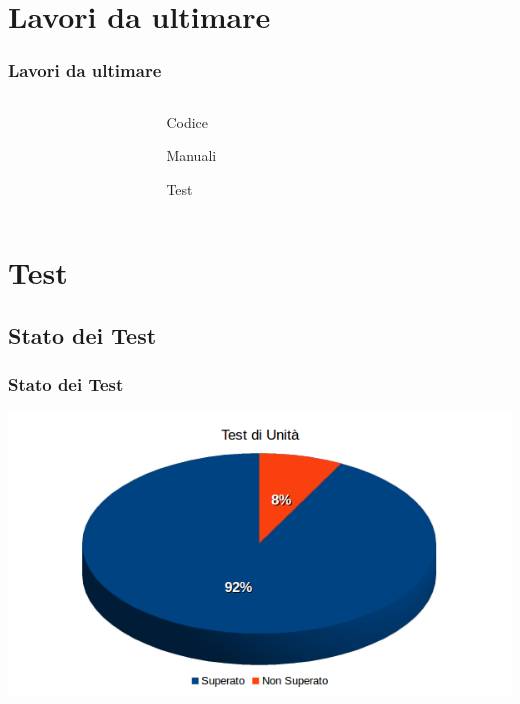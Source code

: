 \section{Lavori da ultimare}
\begin{frame}
	\frametitle{Lavori da ultimare}
	
	\begin{columns}
		\begin{column}{0.4\textwidth}
			
		\end{column}
		
		\begin{column}{0.5\textwidth}
			\begin{itemize}
			\end{itemize}
		\end{column}
		
		\begin{column}{0.2\textwidth}
			
		\end{column}
	\end{columns}
	
\end{frame}

\section{Test}

\subsection{Stato dei Test}
\begin{frame}
	\frametitle{Stato dei Test}
	\begin{center}
	\includegraphics[scale=0.55]{img/TU.png}
	\end{center}
\end{frame}

